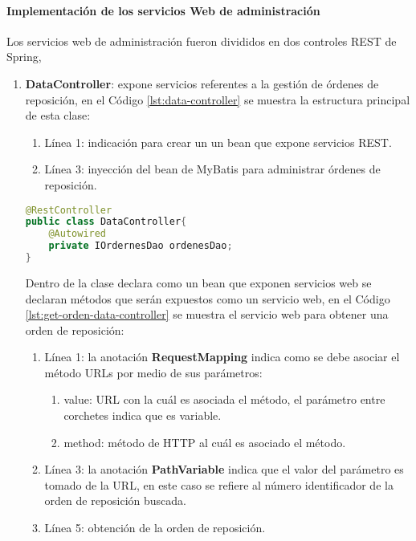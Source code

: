 \paragraph{Implementación de los servicios Web de administración\\}
Los servicios web de administración fueron divididos en dos controles REST de Spring, 
\begin{enumerate}
	\item \textbf{DataController}: expone servicios referentes a la gestión de órdenes de reposición, en el Código \ref{lst:data-controller} se muestra la estructura principal de esta clase:
	\begin{enumerate}
		\item Línea 1: indicación para crear un un bean que expone servicios REST.
		\item Línea 3: inyección del bean de MyBatis para administrar órdenes de reposición.
	\end{enumerate}

\begin{lstlisting}[language=Java, caption={Controlador para exponer servicios Web de órdenes de reposición.}, captionpos=b, label={lst:data-controller}]
@RestController
public class DataController{
	@Autowired
	private IOrdernesDao ordenesDao;
}
\end{lstlisting}

	Dentro de la clase declara como un bean que exponen servicios web se declaran métodos que serán expuestos como un servicio web, en el Código \ref{lst:get-orden-data-controller} se muestra el servicio web para obtener una orden de reposición:
	\begin{enumerate}
		\item Línea 1: la anotación \textbf{RequestMapping} indica como se debe asociar el método URLs por medio de sus parámetros:
		\begin{enumerate}
			\item value: URL con la cuál es asociada el método, el parámetro entre corchetes indica que es variable.
			\item method: método de HTTP al cuál es asociado el método. 
		\end{enumerate}
		\item Línea 3: la anotación \textbf{PathVariable} indica que el valor del parámetro es tomado de la URL, en este caso se refiere al número identificador de la orden de reposición buscada.
		\item Línea 5: obtención de la orden de reposición.
	\end{enumerate}


\end{enumerate}
